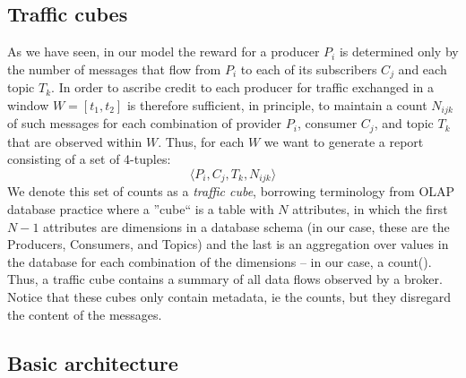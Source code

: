 \documentclass[conference]{IEEEtran}
\begin{document}
\subsection{Traffic cubes}




As we have seen, in our model the reward for a producer $ P_i $ is determined only by the number of messages that flow from $ P_i $ to each of its subscribers $ C_j $ and each topic $ T_k $.
In order to ascribe credit to each producer for traffic exchanged in a window $ W = [t_1, t_2] $ is therefore sufficient, in principle, to maintain a count $ N_{ijk} $ of such messages for each combination of provider $ P_i $, consumer $ C_j $, and topic $ T_k $ that are observed within $ W $.
Thus, for each $ W $ we want to generate a report consisting of a set of 4-tuples:
\[  \langle P_i, C_j, T_k, N_{ijk} \rangle  \]
We denote this set of counts as a \textit{traffic cube}, borrowing terminology from OLAP database practice where a ''cube`` is a table with $ N $ attributes, in which the first $ N-1 $ attributes are  dimensions in a database schema (in our case, these are the Producers, Consumers, and Topics) and the last is an aggregation over values in the database for each combination of the dimensions -- in our case, a count().
Thus, a traffic cube contains a summary  of all data flows observed by a broker. Notice that these cubes only contain metadata, ie the counts, but they disregard the content of the messages.

\subsection{Basic architecture}
\end{document}
